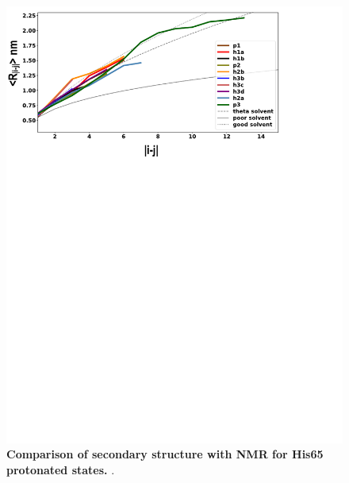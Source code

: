 \documentclass[journal=jacsat,manuscript=article]{achemso}
\begin{document}
\begin{figure}[!ht]
 \includegraphics[scale=0.5,width=\textwidth,trim={0 0cm 0 0},clip]{../figures/S3.pdf}
\caption{{\bf Comparison of secondary structure with NMR for His65 protonated states.}
.
 }
\label{S3} 
\end{figure}
\end{document}
